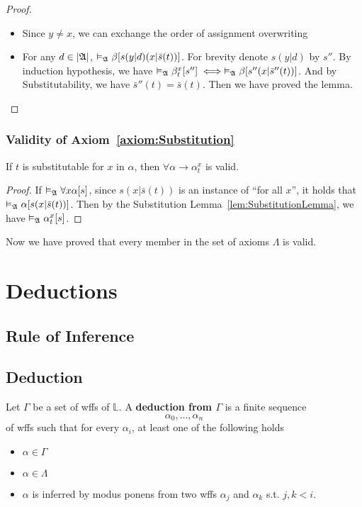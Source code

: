 \begin{proof}
\begin{itemize}
\begin{enumerate}
\begin{itemize}
                \item[] Since $y \neq x$, we can exchange the order of assignment overwriting
                \item[] For any $d \in |\mathfrak{A}|$, $\vDash_{\mathfrak{A}}\beta[s(y|d)(x|\bar{s}(t))]$. For brevity denote $s(y|d)$ by $s''$. By induction hypothesis, we have $\vDash_{\mathfrak{A}}\beta_t^x[s''] \iff \vDash_{\mathfrak{A}}\beta[s''(x|\bar{s}''(t))]$. And by Substitutability, we have $\bar{s}''(t) = \bar{s}(t)$. Then we have proved the lemma.
            \end{itemize}
        \end{enumerate} 
    \end{itemize}
\end{proof}

\subsubsection{Validity of Axiom~\ref{axiom:Substitution}}

\begin{theorem}
    If $t$ is substitutable for $x$ in $\alpha$, then $\forall \alpha \to \alpha_t^x$ is valid.
\end{theorem}
\begin{proof}
    If $\vDash_{\mathfrak{A}}\forall x \alpha[s]$, since $s(x|\bar{s}(t))$ is an instance of ``for all $x$'', it holds that $\vDash_{\mathfrak{A}}\alpha[s(x|\bar{s}(t))]$. Then by the Substitution Lemma~\ref{lem:SubstitutionLemma}, we have $\vDash_{\mathfrak{A}}\alpha_t^x[s]$.
\end{proof}

Now we have proved that every member in the set of axioms $\Lambda$ is valid.

\section{Deductions}

\subsection{Rule of Inference}



\subsection{Deduction}

\begin{definition}[Deduction]
    Let $\Gamma$ be a set of wffs of $\mathbb{L}$. A \textbf{deduction from $\Gamma$} is a finite sequence
    \[ \alpha_0,\dots,\alpha_n \]
    of wffs such that for every $\alpha_i$, at least one of the following holds
    \begin{itemize}
        \item $\alpha\in\Gamma$
        \item $\alpha\in\Lambda$
        \item $\alpha$ is inferred by modus ponens from two wffs $\alpha_j$ and $\alpha_k$ s.t. $j,k < i$.
    \end{itemize}
\end{definition}

